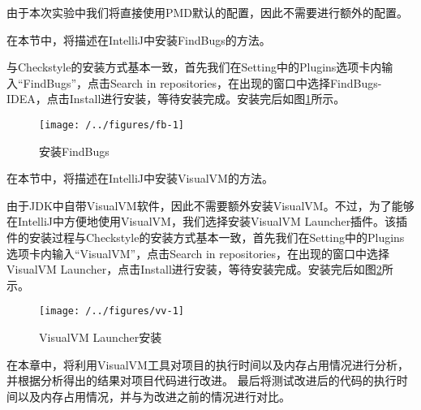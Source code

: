 由于本次实验中我们将直接使用PMD默认的配置，因此不需要进行额外的配置。

在本节中，将描述在IntelliJ中安装FindBugs的方法。

与Checkstyle的安装方式基本一致，首先我们在Setting中的Plugins选项卡内输入“FindBugs”，点击Search in repositories，在出现的窗口中选择FindBugs-IDEA，点击Install进行安装，等待安装完成。安装完后如图\ref{fig:fb-1}所示。

\begin{figure}
\centering
\texttt{[image: /../figures/fb-1]}
\caption{安装FindBugs}
\label{fig:fb-1}
\end{figure}

在本节中，将描述在IntelliJ中安装VisualVM的方法。

由于JDK中自带VisualVM软件，因此不需要额外安装VisualVM。不过，为了能够在IntelliJ中方便地使用VisualVM，我们选择安装VisualVM Launcher插件。该插件的安装过程与Checkstyle的安装方式基本一致，首先我们在Setting中的Plugins选项卡内输入“VisualVM”，点击Search in repositories，在出现的窗口中选择VisualVM Launcher，点击Install进行安装，等待安装完成。安装完后如图\ref{fig:vv-1}所示。

\begin{figure}
\centering
\texttt{[image: /../figures/vv-1]}
\caption{VisualVM Launcher安装}
\label{fig:vv-1}
\end{figure}






在本章中，将利用VisualVM工具对项目的执行时间以及内存占用情况进行分析，并根据分析得出的结果对项目代码进行改进。
最后将测试改进后的代码的执行时间以及内存占用情况，并与为改进之前的情况进行对比。

